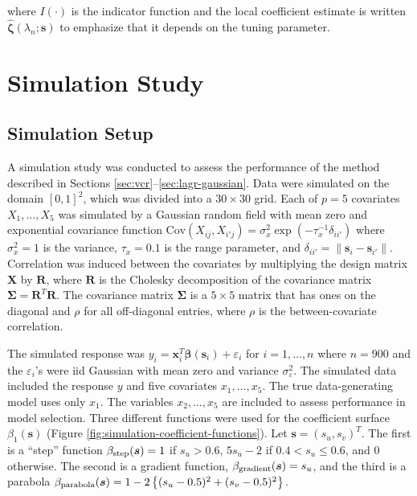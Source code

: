 \documentclass[authoryear,review, 12pt]{elsarticle}
\begin{document}
where $I\left(\cdot\right)$ is the indicator function and the local
coefficient estimate is written $\hat{\bm{\zeta}}(\lambda_{n};\bm{s})$
to emphasize that it depends on the tuning parameter.

\section{Simulation Study\label{sec:simulations}}

\subsection{Simulation Setup}

A simulation study was conducted to assess the performance of the
method described in Sections \ref{sec:vcr}--\ref{sec:lagr-gaussian}.
Data were simulated on the domain $[0,1]^{2}$, which was divided
into a $30\times30$ grid. Each of $p=5$ covariates $X_{1},\dots,X_{5}$
was simulated by a Gaussian random field with mean zero and exponential
covariance function $\text{Cov}\left(X_{ij},X_{i'j}\right)=\sigma_{x}^{2}\exp\left(-\tau_{x}^{-1}\delta_{ii'}\right)$
where $\sigma_{x}^{2}=1$ is the variance, $\tau_{x}=0.1$ is the
range parameter, and $\delta_{ii'}=\|\bm{s}_{i}-\bm{s}_{i'}\|$. Correlation
was induced between the covariates by multiplying the design matrix
$\bm{X}$ by $\bm{R}$, where $\bm{R}$ is the Cholesky decomposition
of the covariance matrix $\bm{\Sigma}=\bm{R}^{T}\bm{R}$. The covariance
matrix $\bm{\Sigma}$ is a $5\times5$ matrix that has ones on the
diagonal and $\rho$ for all off-diagonal entries, where $\rho$ is
the between-covariate correlation. 

The simulated response was $y_{i}=\bm{x}_{i}^{T}\bm{\beta}(\bm{s}_{i})+\varepsilon_{i}$
for $i=1,\dots,n$ where $n=900$ and the $\varepsilon_{i}$'s were
iid Gaussian with mean zero and variance $\sigma_{\varepsilon}^{2}$.
The simulated data included the response $y$ and five covariates
$x_{1},\dots,x_{5}$. The true data-generating model uses only $x_{1}$.
The variables $x_{2},\dots,x_{5}$ are included to assess performance
in model selection. Three different functions were used for the coefficient
surface $\beta_{1}(\bm{s})$ (Figure \ref{fig:simulation-coefficient-functions}).
Let $\bm{s}=(s_{u},s_{v})^{T}$. The first is a ``step'' function
$\beta_{{\rm step}}(\bm{s})=1$ if $s_{u}>0.6$, $5s_{u}-2$ if $0.4<s_{u}\le0.6$,
and $0$ otherwise. The second is a gradient function, $\beta_{{\rm gradient}}(\bm{s})=s_{u}$,
and the third is a parabola $\beta_{{\rm parabola}}(\bm{s})=1-2\left\{ (s_{u}-0.5)^{2}+(s_{v}-0.5)^{2}\right\} $.
\end{document}
